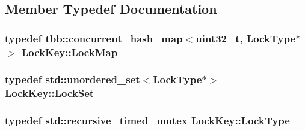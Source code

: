 \subsection{Member Typedef Documentation}
\hypertarget{classLockKey_ac1fcdfbaee1acc65af16330619a8da6b}{
\subsubsection[{Lock\-Map}]{\setlength{\rightskip}{0pt plus 5cm}typedef tbb\-::concurrent\-\_\-hash\-\_\-map$<$uint32\-\_\-t, {\bf Lock\-Type}$\ast$$>$ {\bf Lock\-Key\-::\-Lock\-Map}\hspace{0.3cm}{\ttfamily [private]}}}\label{classLockKey_ac1fcdfbaee1acc65af16330619a8da6b}
\hypertarget{classLockKey_ac9cd4ebc6a682f3f1e879d89062af047}{
\subsubsection[{Lock\-Set}]{\setlength{\rightskip}{0pt plus 5cm}typedef std\-::unordered\-\_\-set$<${\bf Lock\-Type}$\ast$$>$ {\bf Lock\-Key\-::\-Lock\-Set}\hspace{0.3cm}{\ttfamily [private]}}}\label{classLockKey_ac9cd4ebc6a682f3f1e879d89062af047}
\hypertarget{classLockKey_a1d353f7485eb028eba4f8d8b310671d2}{
\subsubsection[{Lock\-Type}]{\setlength{\rightskip}{0pt plus 5cm}typedef std\-::recursive\-\_\-timed\-\_\-mutex {\bf Lock\-Key\-::\-Lock\-Type}\hspace{0.3cm}{\ttfamily [private]}}}\label{classLockKey_a1d353f7485eb028eba4f8d8b310671d2}


